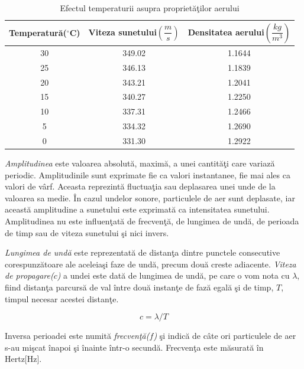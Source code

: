 	\bigskip
	\begin{table}[!htb]
		\centering		
	\begin{tabular}{|c|c|c|}
		\hline
		\bf{Temperatur\u{a}($^{\circ}$C)} & \bf{Viteza sunetului$\left(\dfrac{m}{s} \right)$} & \bf{Densitatea aerului$\left(\dfrac{kg}{m^3}\right)$}\\
		\hline \hline
		
		30 & 349.02 & 1.1644\\
		\hline
		25 & 346.13 & 1.1839\\
		\hline
		20 & 343.21 & 1.2041\\
		\hline
		15 & 340.27 & 1.2250\\
		\hline
		10 & 337.31 & 1.2466\\
		\hline
		5 & 334.32 & 1.2690\\
		\hline
		0 & 331.30 & 1.2922\\
		\hline			
	\end{tabular}
	\caption{Efectul temperaturii asupra propriet\u{a}\c{t}ilor aerului\cite{temperaturaTabel}}
	\label{Tabel1}
	\end{table}

	{\it{Amplitudinea}} este valoarea absolut\u{a}, maxim\u{a}, a unei cantit\u{a}\c{t}i care variaz\u{a} periodic. Amplitudinile sunt exprimate fie ca valori instantanee, fie mai ales ca valori de v\^{a}rf. Aceasta reprezint\u{a} fluctua\c{t}ia sau deplasarea unei unde de la valoarea sa medie. \^{I}n cazul undelor sonore, particulele de aer sunt deplasate, iar aceast\u{a} amplitudine a sunetului este exprimat\u{a} ca intensitatea sunetului. Amplitudinea nu este influen\c{t}at\u{a} de frecven\c{t}\u{a}, de lungimea de und\u{a}, de perioada de timp sau de viteza sunetului \c{s}i nici invers.
	\bigskip

	{\it{Lungimea de und\u{a}}} este reprezentat\u{a} de distan\c{t}a dintre punctele consecutive corespunz\u{a}toare ale aceleia\c{s}i faze de und\u{a}, precum dou\u{a} creste adiacente. {\it{Viteza de propagare($c$)}} a undei este dat\u{a} de lungimea de und\u{a}, pe care o vom nota cu $\lambda$, fiind distan\c{t}a parcurs\u{a} de val \^{i}ntre dou\u{a} instan\c{t}e de faz\u{a} egal\u{a} \c{s}i de timp, $T$, timpul necesar acestei distan\c{t}e.
	
	\begin{equation}
	c=\lambda/T
	\end{equation}
	\bigskip
	
	Inversa perioadei este numit\u{a} {\it{frecven\c{t}\u{a}($f$)}} \c{s}i indic\u{a} de c\^{a}te ori particulele de aer s-au mi\c{s}cat \^{i}napoi \c{s}i \^{i}nainte \^{i}ntr-o secund\u{a}. Frecven\c{t}a este m\u{a}surat\u{a} \^{i}n Hertz[Hz].
	
